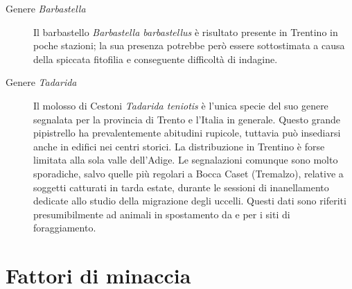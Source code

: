 \documentclass[10pt,twoside,openany,x11names,svgnames,italian,a5paper,dvipsnames,table]{memoir}
\newcommand\chapterillustration{}
\newcommand{\ph}{\emph{Ph}. }
\begin{document}
\begin{description}
  \item [Genere \emph{Barbastella}]
  Il barbastello \emph{Barbastella barbastellus} è risultato presente in Trentino in poche stazioni; la sua presenza potrebbe però essere sottostimata a causa della spiccata fitofilia e conseguente difficoltà di indagine. 
  \item [Genere \emph{Tadarida}]
  Il molosso di Cestoni \emph{Tadarida teniotis} è l’unica specie del suo genere segnalata per la provincia di Trento e l’Italia in generale. Questo grande pipistrello ha prevalentemente abitudini rupicole, tuttavia può insediarsi anche in edifici nei centri storici. La distribuzione in Trentino è forse limitata alla sola valle dell’Adige. Le segnalazioni comunque sono molto sporadiche, salvo quelle più regolari a Bocca Caset (Tremalzo), relative a soggetti catturati in tarda estate, durante le sessioni di inanellamento dedicate allo studio della migrazione degli uccelli. Questi dati sono riferiti presumibilmente ad animali in spostamento da e per i siti di foraggiamento.
\end{description}

\begin{comment}
  \vspace*{\fill}
  \vspace{-.4cm}
  \begin{center}
    \texttt{[image: pipistrellus.jpg]}
  \end{center}
  \captionof*{figure}{\textbf{Pipistrello nano} \emph{Pipistrellus pipistrellus}. Piccolo pipistrello strettamente legato agli ambienti antropici è facile osservarlo in caccia sotto i lampioni stradali (\ph Arch. MUSE)}
  \vspace*{\fill}
 \end{comment}

\chapter{Fattori di minaccia}
\renewcommand\chapterillustration{7.jpg}
\end{document}
